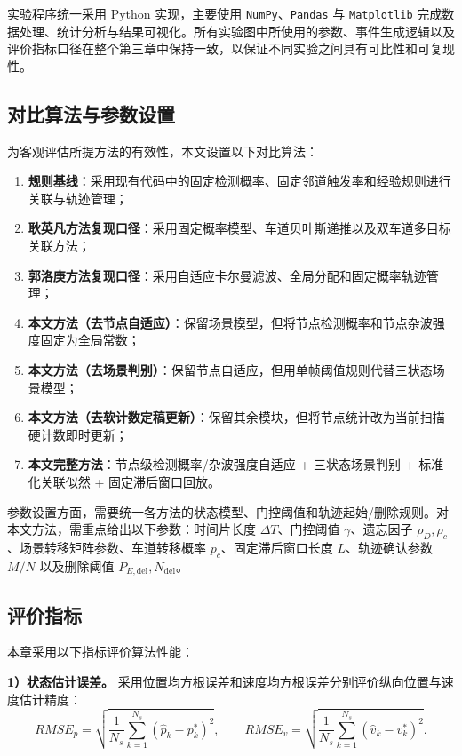 \documentclass{xdupgthesis}
\begin{document}
实验程序统一采用 Python 实现，主要使用 \texttt{NumPy}、\texttt{Pandas} 与 \texttt{Matplotlib} 完成数据处理、统计分析与结果可视化。所有实验图中所使用的参数、事件生成逻辑以及评价指标口径在整个第三章中保持一致，以保证不同实验之间具有可比性和可复现性。


\subsection{对比算法与参数设置}

为客观评估所提方法的有效性，本文设置以下对比算法：
\begin{enumerate}
	\item \textbf{规则基线}：采用现有代码中的固定检测概率、固定邻道触发率和经验规则进行关联与轨迹管理；
	\item \textbf{耿英凡方法复现口径}：采用固定概率模型、车道贝叶斯递推以及双车道多目标关联方法；
	\item \textbf{郭洛庚方法复现口径}：采用自适应卡尔曼滤波、全局分配和固定概率轨迹管理；
	\item \textbf{本文方法（去节点自适应）}：保留场景模型，但将节点检测概率和节点杂波强度固定为全局常数；
	\item \textbf{本文方法（去场景判别）}：保留节点自适应，但用单帧阈值规则代替三状态场景模型；
	\item \textbf{本文方法（去软计数定稿更新）}：保留其余模块，但将节点统计改为当前扫描硬计数即时更新；
	\item \textbf{本文完整方法}：节点级检测概率/杂波强度自适应 + 三状态场景判别 + 标准化关联似然 + 固定滞后窗口回放。
\end{enumerate}

参数设置方面，需要统一各方法的状态模型、门控阈值和轨迹起始/删除规则。对本文方法，需重点给出以下参数：时间片长度 $\Delta T$、门控阈值 $\gamma$、遗忘因子 $\rho_D,\rho_c$、场景转移矩阵参数、车道转移概率 $p_c$、固定滞后窗口长度 $L$、轨迹确认参数 $M/N$ 以及删除阈值 $P_{E,\mathrm{del}},N_{\mathrm{del}}$。
\subsection{评价指标}

本章采用以下指标评价算法性能：

\textbf{1）状态估计误差。} 采用位置均方根误差和速度均方根误差分别评价纵向位置与速度估计精度：
\begin{equation}
	RMSE_p=
	\sqrt{\frac{1}{N_s}\sum_{k=1}^{N_s}(\hat p_k-p_k^{\ast})^2},
	\qquad
	RMSE_v=
	\sqrt{\frac{1}{N_s}\sum_{k=1}^{N_s}(\hat v_k-v_k^{\ast})^2}.
	\label{eq:ch3_rmse_v2}
\end{equation}
\end{document}
